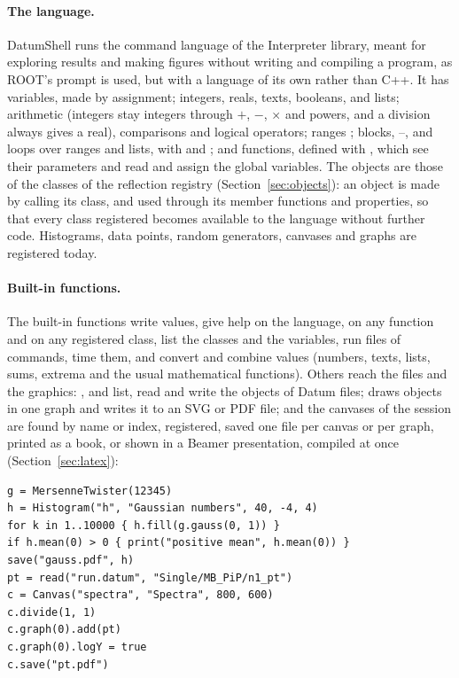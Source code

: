 \paragraph{The language.}
DatumShell runs the command language of the Interpreter library, meant for exploring results and making figures
without writing and compiling a program, as ROOT's prompt is used, but with a language of its own rather than C++.
It has variables, made by assignment; integers, reals, texts, booleans,  and lists; arithmetic (integers
stay integers through $+$, $-$, $\times$ and powers, and a division always gives a real), comparisons and logical
operators; ranges ; blocks, --,  and  loops over ranges and lists,
with  and ; and functions, defined with , which see their parameters and read and
assign the global variables. The objects are those of the classes of the reflection registry
(Section~\ref{sec:objects}): an object is made by calling its class, and used through its member functions and
properties, so that every class registered becomes available to the language without further code. Histograms, data
points, random generators, canvases and graphs are registered today.

\paragraph{Built-in functions.}
The built-in functions write values, give help on the language, on any function and on any registered class, list
the classes and the variables, run files of commands, time them, and convert and combine values (numbers, texts,
lists, sums, extrema and the usual mathematical functions). Others reach the files and the graphics: ,
 and  list, read and write the objects of Datum files;  draws objects in one graph and
writes it to an SVG or PDF file; and the canvases of the session are found by name or index, registered, saved one
file per canvas or per graph, printed as a book, or shown in a Beamer presentation, compiled at once
(Section~\ref{sec:latex}):
\begin{widetext}
\begin{verbatim}
g = MersenneTwister(12345)
h = Histogram("h", "Gaussian numbers", 40, -4, 4)
for k in 1..10000 { h.fill(g.gauss(0, 1)) }
if h.mean(0) > 0 { print("positive mean", h.mean(0)) }
save("gauss.pdf", h)
pt = read("run.datum", "Single/MB_PiP/n1_pt")
c = Canvas("spectra", "Spectra", 800, 600)
c.divide(1, 1)
c.graph(0).add(pt)
c.graph(0).logY = true
c.save("pt.pdf")
\end{verbatim}
\end{widetext}

